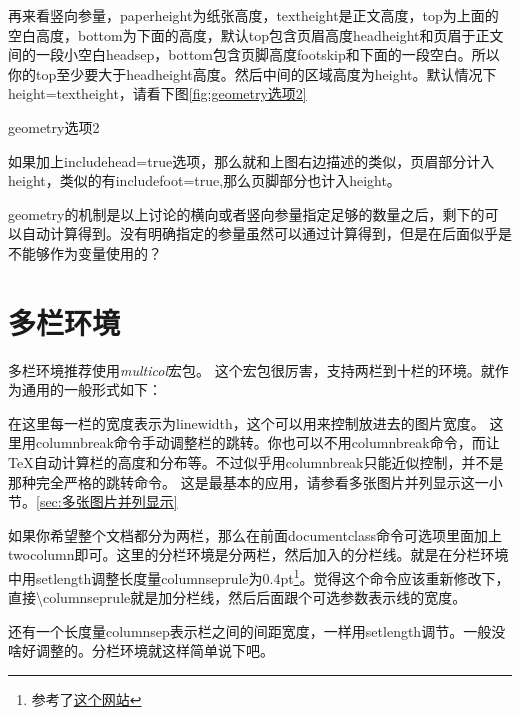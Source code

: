 \documentclass[11pt,oneside]{book}
\begin{document}
再来看竖向参量，paperheight为纸张高度，textheight是正文高度，top为上面的空白高度，bottom为下面的高度，默认top包含页眉高度headheight和页眉于正文间的一段小空白headsep，bottom包含页脚高度footskip和下面的一段空白。所以你的top至少要大于headheight高度。然后中间的区域高度为height。默认情况下height=textheight，请看下图\ref{fig:geometry选项2}

\begin{linefig}{geometry选项2}  
\caption{geometry选项2}
\label{fig:geometry选项2}
\end{linefig}

如果加上includehead=true选项，那么就和上图右边描述的类似，页眉部分计入height，类似的有includefoot=true,那么页脚部分也计入height。

geometry的机制是以上讨论的横向或者竖向参量指定足够的数量之后，剩下的可以自动计算得到。没有明确指定的参量虽然可以通过计算得到，但是在后面似乎是不能够作为变量使用的？




\section{多栏环境}
多栏环境推荐使用\emph{multicol}宏包。
这个宏包很厉害，支持两栏到十栏的环境。就作为通用的一般形式如下：

在这里每一栏的宽度表示为linewidth，这个可以用来控制放进去的图片宽度。
这里用columnbreak命令手动调整栏的跳转。你也可以不用columnbreak命令，而让\TeX 自动计算栏的高度和分布等。不过似乎用columnbreak只能近似控制，并不是那种完全严格的跳转命令。
这是最基本的应用，请参看多张图片并列显示这一小节。\ref{sec:多张图片并列显示}



\begin{multicols}{2}
\setlength{\columnseprule}{0.4pt}
如果你希望整个文档都分为两栏，那么在前面documentclass命令可选项里面加上twocolumn即可。这里的分栏环境是分两栏，然后加入的分栏线。就是在分栏环境中用setlength调整长度量columnseprule为0.4pt\footnote{参考了\href{http://texblog.org/tag/columnseprule/}{这个网站}}。觉得这个命令应该重新修改下，直接\textbackslash columnseprule就是加分栏线，然后后面跟个可选参数表示线的宽度。

还有一个长度量columnsep表示栏之间的间距宽度，一样用setlength调节。一般没啥好调整的。分栏环境就这样简单说下吧。
\end{multicols}
\end{document}
